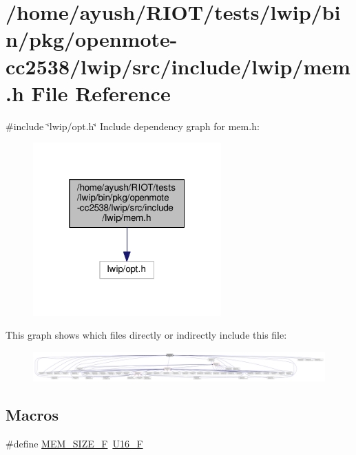 \hypertarget{openmote-cc2538_2lwip_2src_2include_2lwip_2mem_8h}{}\section{/home/ayush/\+R\+I\+O\+T/tests/lwip/bin/pkg/openmote-\/cc2538/lwip/src/include/lwip/mem.h File Reference}
\label{openmote-cc2538_2lwip_2src_2include_2lwip_2mem_8h}
{\ttfamily \#include \char`\"{}lwip/opt.\+h\char`\"{}}\newline
Include dependency graph for mem.\+h\+:
\nopagebreak
\begin{figure}[H]
\begin{center}
\leavevmode
\includegraphics[width=205pt]{openmote-cc2538_2lwip_2src_2include_2lwip_2mem_8h__incl}
\end{center}
\end{figure}
This graph shows which files directly or indirectly include this file\+:
\nopagebreak
\begin{figure}[H]
\begin{center}
\leavevmode
\includegraphics[width=350pt]{openmote-cc2538_2lwip_2src_2include_2lwip_2mem_8h__dep__incl}
\end{center}
\end{figure}
\subsection*{Macros}
\begin{DoxyCompactItemize}
\item 
\#define \hyperlink{openmote-cc2538_2lwip_2src_2include_2lwip_2mem_8h_a2cf923436027f37ef24b3abd898120a7}{M\+E\+M\+\_\+\+S\+I\+Z\+E\+\_\+F}~\hyperlink{group__compiler__abstraction_gaa9d7f6eb2ee9fcc5eda3545dbb1886e0}{U16\+\_\+F}
\end{DoxyCompactItemize}
